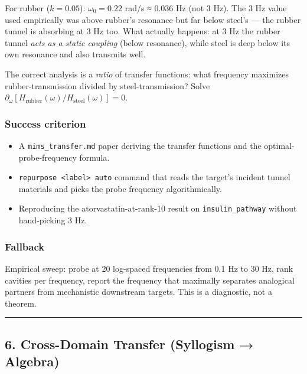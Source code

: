 \documentclass[
  11pt,
  a4paper,
]{article}
\providecommand{\tightlist}{%
  \setlength{\itemsep}{0pt}\setlength{\parskip}{0pt}}
\begin{document}
For rubber (\(k=0.05\)): \(\omega_0 = 0.22\) rad/s ≈ 0.036 Hz (not 3
Hz). The 3 Hz value used empirically was above rubber's resonance but
far below steel's --- the rubber tunnel is absorbing at 3 Hz too. What
actually happens: at 3 Hz the rubber tunnel \emph{acts as a static
coupling} (below resonance), while steel is deep below its own resonance
and also transmits well.

The correct analysis is a \emph{ratio} of transfer functions: what
frequency maximizes rubber-transmission divided by steel-transmission?
Solve
\(\partial_\omega [H_\text{rubber}(\omega) / H_\text{steel}(\omega)] = 0\).

\subsubsection{Success criterion}\label{success-criterion-4}

\begin{itemize}
\tightlist
\item
  A \texttt{mims\_transfer.md} paper deriving the transfer functions and
  the optimal-probe-frequency formula.
\item
  \texttt{repurpose\ \textless{}label\textgreater{}\ auto} command that
  reads the target's incident tunnel materials and picks the probe
  frequency algorithmically.
\item
  Reproducing the atorvastatin-at-rank-10 result on
  \texttt{insulin\_pathway} without hand-picking 3 Hz.
\end{itemize}

\subsubsection{Fallback}\label{fallback-1}

Empirical sweep: probe at 20 log-spaced frequencies from 0.1 Hz to 30
Hz, rank cavities per frequency, report the frequency that maximally
separates analogical partners from mechanistic downstream targets. This
is a diagnostic, not a theorem.

\begin{center}\rule{0.5\linewidth}{0.5pt}\end{center}

\subsection{6. Cross-Domain Transfer (Syllogism →
Algebra)}\label{cross-domain-transfer-syllogism-algebra}
\end{document}
